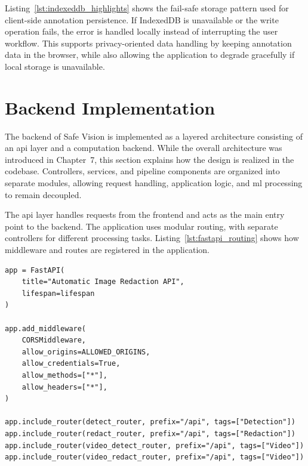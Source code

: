 Listing~\ref{lst:indexeddb_highlights} shows the fail-safe storage pattern used for client-side annotation persistence. If IndexedDB is unavailable or the write operation fails, the error is handled locally instead of interrupting the user workflow. This supports privacy-oriented data handling by keeping annotation data in the browser, while also allowing the application to degrade gracefully if local storage is unavailable.

\section{Backend Implementation}
\label{backend_implementation}

The backend of Safe Vision is implemented as a layered architecture consisting of an \acrshort{api} layer and a computation backend. While the overall architecture was introduced in Chapter~7, this section explains how the design is realized in the codebase. Controllers, services, and pipeline components are organized into separate modules, allowing request handling, application logic, and \acrshort{ml} processing to remain decoupled.


The \acrshort{api} layer handles requests from the frontend and acts as the main entry point to the backend. The application uses modular routing, with separate controllers for different processing tasks. Listing~\ref{lst:fastapi_routing} shows how middleware and routes are registered in the application.

\begin{lstlisting}[caption={FastAPI application structure and routing}, label={lst:fastapi_routing}]
app = FastAPI(
    title="Automatic Image Redaction API",
    lifespan=lifespan
)

app.add_middleware(
    CORSMiddleware,
    allow_origins=ALLOWED_ORIGINS,
    allow_credentials=True,
    allow_methods=["*"],
    allow_headers=["*"],
)

app.include_router(detect_router, prefix="/api", tags=["Detection"])
app.include_router(redact_router, prefix="/api", tags=["Redaction"])
app.include_router(video_detect_router, prefix="/api", tags=["Video"])
app.include_router(video_redact_router, prefix="/api", tags=["Video"])
\end{lstlisting}

